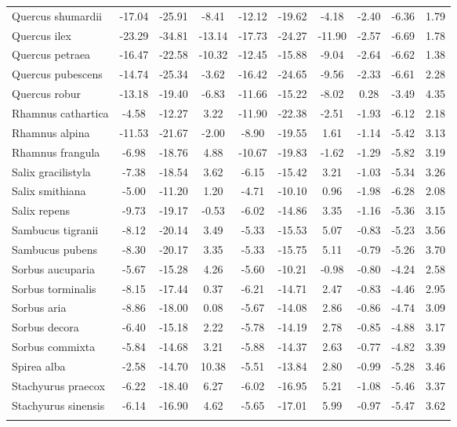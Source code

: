 \documentclass[11pt]{article}
\begin{document}
\begin{longtable}{p{1.50in}c{0.32in}c{0.32in}c{0.32in}c{0.32in}c{0.32in}c{0.32in}c{0.2in}c{0.3in}c{0.1in}}
  Quercus shumardii & -17.04 & -25.91 & -8.41 & -12.12 & -19.62 & -4.18 & -2.40 & -6.36 & 1.79 \\ 
  Quercus ilex & -23.29 & -34.81 & -13.14 & -17.73 & -24.27 & -11.90 & -2.57 & -6.69 & 1.78 \\ 
  Quercus petraea & -16.47 & -22.58 & -10.32 & -12.45 & -15.88 & -9.04 & -2.64 & -6.62 & 1.38 \\ 
  Quercus pubescens & -14.74 & -25.34 & -3.62 & -16.42 & -24.65 & -9.56 & -2.33 & -6.61 & 2.28 \\ 
  Quercus robur & -13.18 & -19.40 & -6.83 & -11.66 & -15.22 & -8.02 & 0.28 & -3.49 & 4.35 \\ 
  Rhamnus cathartica & -4.58 & -12.27 & 3.22 & -11.90 & -22.38 & -2.51 & -1.93 & -6.12 & 2.18 \\ 
  Rhamnus alpina & -11.53 & -21.67 & -2.00 & -8.90 & -19.55 & 1.61 & -1.14 & -5.42 & 3.13 \\ 
  Rhamnus frangula & -6.98 & -18.76 & 4.88 & -10.67 & -19.83 & -1.62 & -1.29 & -5.82 & 3.19 \\ 
  Salix gracilistyla & -7.38 & -18.54 & 3.62 & -6.15 & -15.42 & 3.21 & -1.03 & -5.34 & 3.26 \\ 
  Salix smithiana & -5.00 & -11.20 & 1.20 & -4.71 & -10.10 & 0.96 & -1.98 & -6.28 & 2.08 \\ 
  Salix repens & -9.73 & -19.17 & -0.53 & -6.02 & -14.86 & 3.35 & -1.16 & -5.36 & 3.15 \\ 
  Sambucus tigranii & -8.12 & -20.14 & 3.49 & -5.33 & -15.53 & 5.07 & -0.83 & -5.23 & 3.56 \\ 
  Sambucus pubens & -8.30 & -20.17 & 3.35 & -5.33 & -15.75 & 5.11 & -0.79 & -5.26 & 3.70 \\ 
  Sorbus aucuparia & -5.67 & -15.28 & 4.26 & -5.60 & -10.21 & -0.98 & -0.80 & -4.24 & 2.58 \\ 
  Sorbus torminalis & -8.15 & -17.44 & 0.37 & -6.21 & -14.71 & 2.47 & -0.83 & -4.46 & 2.95 \\ 
  Sorbus aria & -8.86 & -18.00 & 0.08 & -5.67 & -14.08 & 2.86 & -0.86 & -4.74 & 3.09 \\ 
  Sorbus decora & -6.40 & -15.18 & 2.22 & -5.78 & -14.19 & 2.78 & -0.85 & -4.88 & 3.17 \\ 
  Sorbus commixta & -5.84 & -14.68 & 3.21 & -5.88 & -14.37 & 2.63 & -0.77 & -4.82 & 3.39 \\ 
  Spirea alba & -2.58 & -14.70 & 10.38 & -5.51 & -13.84 & 2.80 & -0.99 & -5.28 & 3.46 \\ 
  Stachyurus praecox & -6.22 & -18.40 & 6.27 & -6.02 & -16.95 & 5.21 & -1.08 & -5.46 & 3.37 \\ 
  Stachyurus sinensis & -6.14 & -16.90 & 4.62 & -5.65 & -17.01 & 5.99 & -0.97 & -5.47 & 3.62 \\ 
  \hline
\label{tab:tablesupp3}
\end{longtable}
\end{document}
